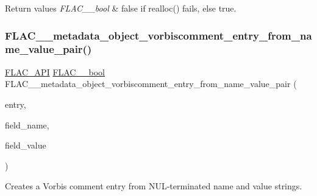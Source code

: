 \begin{DoxyRetVals}{Return values}
{\em F\+L\+A\+C\+\_\+\+\_\+bool} & {\ttfamily false} if realloc() fails, else {\ttfamily true}. \\
\hline
\end{DoxyRetVals}
\mbox{\label{group__flac__metadata__object_ga0ec0c7ddd3a8832ee7a75bf47956b1c7}} 
\subsubsection{\texorpdfstring{F\+L\+A\+C\+\_\+\+\_\+metadata\+\_\+object\+\_\+vorbiscomment\+\_\+entry\+\_\+from\+\_\+name\+\_\+value\+\_\+pair()}{FLAC\_\_metadata\_object\_vorbiscomment\_entry\_from\_name\_value\_pair()}}
{\footnotesize\ttfamily \hyperlink{group__flac__export_ga56ca07df8a23310707732b1c0007d6f5}{F\+L\+A\+C\+\_\+\+A\+PI} \hyperlink{ordinals_8h_a95103469f1cbd78b8cf250194985b34e}{F\+L\+A\+C\+\_\+\+\_\+bool} F\+L\+A\+C\+\_\+\+\_\+metadata\+\_\+object\+\_\+vorbiscomment\+\_\+entry\+\_\+from\+\_\+name\+\_\+value\+\_\+pair (\begin{DoxyParamCaption}\item[{\hyperlink{struct_f_l_a_c_____stream_metadata___vorbis_comment___entry}{F\+L\+A\+C\+\_\+\+\_\+\+Stream\+Metadata\+\_\+\+Vorbis\+Comment\+\_\+\+Entry} $\ast$}]{entry,  }\item[{\hyperlink{zconf_8h_a2c212835823e3c54a8ab6d95c652660e}{const} char $\ast$}]{field\+\_\+name,  }\item[{\hyperlink{zconf_8h_a2c212835823e3c54a8ab6d95c652660e}{const} char $\ast$}]{field\+\_\+value }\end{DoxyParamCaption})}

Creates a Vorbis comment entry from N\+U\+L-\/terminated name and value strings.


